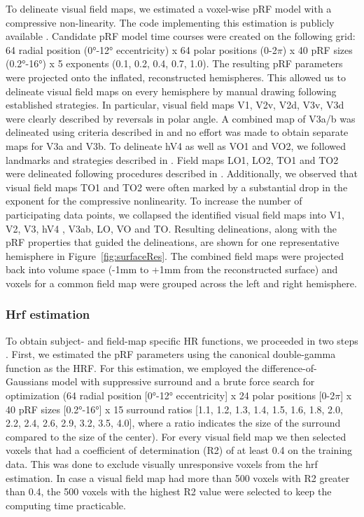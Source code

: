 To delineate visual field maps, we estimated a voxel-wise pRF model with a compressive non-linearity. The code implementing this estimation is publicly available \parencite{pyprf_motion}. Candidate pRF model time courses were created on the following grid: 64 radial position (0°-12° eccentricity) x 64 polar positions (0-2$\pi$) x 40 pRF sizes (0.2°-16°) x 5 exponents (0.1, 0.2, 0.4, 0.7, 1.0). The resulting pRF parameters were projected onto the inflated, reconstructed hemispheres. This allowed us to delineate visual field maps on every hemisphere by manual drawing following established strategies. In particular, visual field maps V1, V2v, V2d, V3v, V3d were clearly described by reversals in polar angle. A combined map of V3a/b was delineated using criteria described in \cite{Wandell2005, Larsson2006} and no effort was made to obtain separate maps for V3a and V3b. To delineate hV4 as well as VO1 and VO2, we followed landmarks and strategies described in \cite{Winawer2017}. Field maps LO1, LO2, TO1 and TO2 were delineated following procedures described in \cite{Amano2009}. Additionally, we observed that visual field maps TO1 and TO2 were often marked by a substantial drop in the exponent for the compressive nonlinearity. To increase the number of participating data points, we collapsed the identified visual field maps into V1, V2, V3, hV4 \parencite{Winawer2010}, V3ab, LO, VO and TO. Resulting delineations, along with the pRF properties that guided the delineations, are shown for one representative hemisphere in Figure~\ref{fig:surfaceRes}. The combined field maps were projected back into volume space (-1mm to +1mm from the reconstructed surface) and voxels for a common field map were grouped across the left and right hemisphere.

\subsubsection{Hrf estimation}
To obtain subject- and field-map specific HR functions, we proceeded in two steps \parencite{Harvey2011, Harvey2015, Harvey2016}. First, we estimated the pRF parameters using the canonical double-gamma function \parencite{Friston1998} as the HRF. For this estimation, we employed the difference-of-Gaussians model with suppressive surround and a brute force search for optimization (64 radial position [0°-12° eccentricity] x 24 polar positions [0-2$\pi$] x 40 pRF sizes [0.2°-16°] x 15 surround ratios [1.1, 1.2, 1.3, 1.4, 1.5, 1.6, 1.8, 2.0, 2.2, 2.4, 2.6, 2.9, 3.2, 3.5, 4.0], where a ratio indicates the size of the surround compared to the size of the center). For every visual field map we then selected voxels that had a coefficient of determination (R2) of at least 0.4 on the training data. This was done to exclude visually unresponsive voxels from the hrf estimation. In case a visual field map had more than 500 voxels with R2 greater than 0.4, the 500 voxels with the highest R2 value were selected to keep the computing time practicable.

